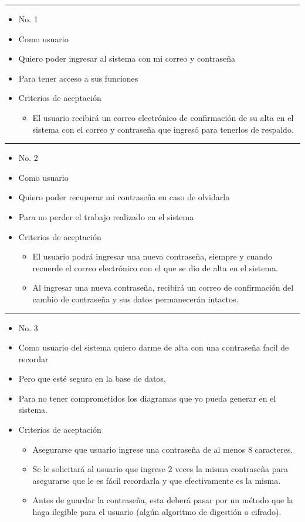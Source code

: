 \noindent\rule{\textwidth}{1pt}
\begin{itemize}
	\item No. 1
	\item Como usuario
	\item Quiero poder ingresar al sistema con mi correo y contraseña
	\item Para tener acceso a sus funciones
	\item Criterios de aceptación
	\begin{itemize}
		\item El usuario recibirá un correo electrónico de confirmación de su alta en el sistema con el correo y contraseña que ingresó para tenerlos de respaldo.
	\end{itemize}
\end{itemize}
\noindent\rule{\textwidth}{1pt}
\begin{itemize}
	\item No. 2
	\item Como usuario
	\item Quiero poder recuperar mi contraseña en caso de olvidarla
	\item Para no perder el trabajo realizado en el sistema
	\item Criterios de aceptación
	\begin{itemize}
		\item El usuario podrá ingresar una nueva contraseña, siempre y cuando recuerde el correo electrónico con el que se dio de alta en el sistema.
		\item Al ingresar una nueva contraseña, recibirá un correo de confirmación del cambio de contraseña y sus datos permanecerán intactos.
	\end{itemize}
\end{itemize}
\noindent\rule{\textwidth}{1pt}
\begin{itemize}
	\item No. 3
	\item Como usuario del sistema quiero darme de alta con una contraseña facil de recordar
	\item Pero que esté segura en la base de datos,
	\item Para no tener comprometidos los diagramas que yo pueda generar en el sistema.

	\item Criterios de aceptación
	\begin{itemize}
		\item Asegurarse que usuario ingrese una contraseña de al menos 8 caracteres.
		\item Se le solicitará al usuario que ingrese 2 veces la misma contraseña para asegurarse que le es fácil recordarla y que efectivamente es la misma.
		\item Antes de guardar la contraseña, esta deberá pasar por un método que la haga ilegible para el usuario (algún algoritmo de digestión o cifrado).
	\end{itemize}
\end{itemize}
